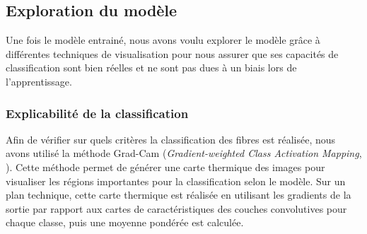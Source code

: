 \subsection{Exploration du modèle}
Une fois le modèle entrainé, nous avons voulu explorer le modèle grâce à différentes techniques de visualisation pour nous assurer que ses capacités de classification sont bien réelles et ne sont pas dues à un biais lors de l'apprentissage.

\subsubsection{Explicabilité de la classification}
Afin de vérifier sur quels critères la classification des fibres est réalisée, nous avons utilisé la méthode Grad-Cam (\textit{Gradient-weighted Class Activation Mapping}, \cite{selvaraju_grad-cam_2020}). Cette méthode permet de générer une carte thermique des images pour visualiser les régions importantes pour la classification selon le modèle. Sur un plan technique, cette carte thermique est réalisée en utilisant les gradients de la sortie par rapport aux cartes de caractéristiques des couches convolutives pour chaque classe, puis une moyenne pondérée est calculée.

